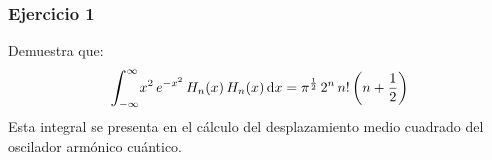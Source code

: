 \documentclass[12pt]{beamer}
\begin{document}
\begin{frame}
\frametitle{Ejercicio 1}
Demuestra que:
\begin{align*}
\scaleint{6ex}_{\bs - \infty}^{\infty} x^{2} \, e^{-x^{2}} \, H_{n}(x) \, H_{n}(x) \dd{x} = \pi^{\frac{1}{2}} \, 2^{n} \, n! \, \bigg( n + \dfrac{1}{2} \bigg)
\end{align*}
Esta integral se presenta en el cálculo del desplazamiento medio cuadrado del oscilador armónico cuántico.
\end{frame}
\end{document}
